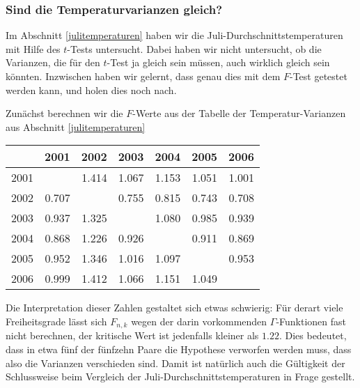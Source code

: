 \subsubsection{Sind die Temperaturvarianzen gleich?}
Im Abschnitt \ref{julitemperaturen} haben wir die
Juli-Durchschnittstemperaturen mit Hilfe des $t$-Tests untersucht.
Dabei haben wir nicht untersucht, ob die Varianzen, die für den
$t$-Test ja gleich sein müssen, auch wirklich gleich sein könnten.
Inzwischen haben wir gelernt, dass genau dies mit dem $F$-Test getestet
werden kann, und holen dies noch nach.

Zunächst berechnen wir die $F$-Werte aus der Tabelle der Temperatur-Varianzen
aus Abschnitt \ref{julitemperaturen}

\begin{center}
\begin{tabular}{|r|rrrrrr|}
\hline
    &  2001&  2002&  2003&  2004&  2005&  2006\\
\hline
2001&      & 1.414& 1.067& 1.153& 1.051& 1.001\\
2002& 0.707&      & 0.755& 0.815& 0.743& 0.708\\
2003& 0.937& 1.325&      & 1.080& 0.985& 0.939\\
2004& 0.868& 1.226& 0.926&      & 0.911& 0.869\\
2005& 0.952& 1.346& 1.016& 1.097&      & 0.953\\
2006& 0.999& 1.412& 1.066& 1.151& 1.049&      \\
\hline
\end{tabular}
\end{center}

Die Interpretation dieser Zahlen gestaltet sich etwas schwierig: Für derart
viele Freiheitsgrade lässt sich $F_{n,k}$ wegen der darin
vorkommenden $\Gamma$-Funktionen fast nicht berechnen, der kritische Wert
ist jedenfalls kleiner als $1.22$.
Dies bedeutet, dass in etwa fünf der
fünfzehn Paare die Hypothese verworfen werden muss, dass also die Varianzen
verschieden sind.
Damit ist natürlich auch die Gültigkeit der Schlussweise
beim Vergleich der Juli-Durchschnittstemperaturen in Frage gestellt.


